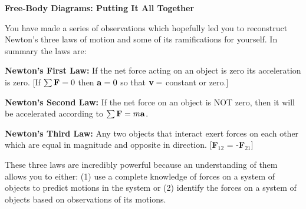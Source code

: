 \textbf{Free-Body Diagrams: Putting It All Together} 

You have made a series of observations which hopefully led you to reconstruct
Newton's three laws of motion and some of its ramifications for yourself. In
summary the laws are:

\textbf{Newton's First Law:} If the net force acting on an object is zero its
acceleration is zero. {[}If \( \sum  {\bf F} = 0\) then ${\bf a} = 0$
so that ${\bf v} =$ constant or zero.{]}

\textbf{Newton's Second Law:} If the net force on an object is NOT zero, then it will be accelerated according to \( \sum {\bf F} = m{\bf a}\).

\textbf{Newton's Third Law:} Any two objects that interact exert forces on each
other which are equal in magnitude and opposite in direction. {[}\textbf{F}\( _{12} \)
= -\textbf{F}\( _{21} \){]}

These three laws are incredibly powerful because an understanding of them allows
you to either: (1) use a complete knowledge of forces on a system of objects
to predict motions in the system or (2) identify the forces on a system of objects
based on observations of its motions. 



%
%


